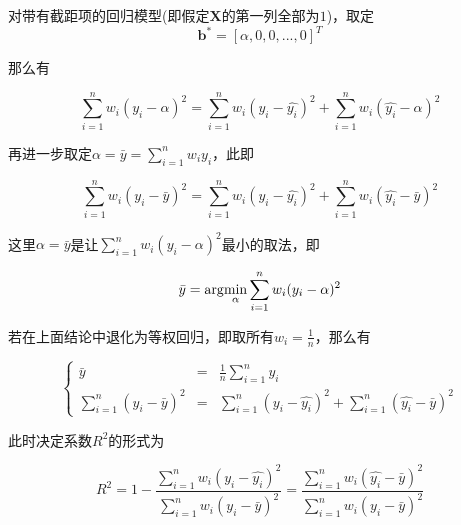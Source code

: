 \begin{mingti}
    对带有截距项的回归模型(即假定$\bm{X}$的第一列全部为$1$)，取定
    \begin{equation}
        \bm{b^*} = [\alpha,0,0,...,0]^T
    \end{equation}

    那么有

    \begin{equation}
        \sum_{i=1}^nw_i(y_i - \alpha)^2 = \sum_{i=1}^nw_i(y_i - \hat{y_i})^2 + \sum_{i=1}^nw_i(\hat{y_i} - \alpha)^2
    \end{equation}

    再进一步取定$\alpha = \bar{y} = \sum_{i=1}^nw_iy_i$，此即

    \begin{equation}
        \sum_{i=1}^nw_i(y_i - \bar{y})^2 = \sum_{i=1}^nw_i(y_i - \hat{y_i})^2 + \sum_{i=1}^nw_i(\hat{y_i} - \bar{y})^2
    \end{equation}

    这里$\alpha = \bar{y}$是让$\sum_{i=1}^nw_i(y_i - \alpha)^2$最小的取法，即

    \begin{equation}
        \bar{y} = \arg\!\min_{\alpha}\sum_{i=1}^nw_i(y_i - \alpha)^2
    \end{equation}

    若在上面结论中退化为等权回归，即取所有$w_i=\frac{1}{n}$，那么有

    \begin{equation}
        \left\{
        \begin{array}{rcl}
            \bar{y}                       & = & \frac{1}{n}\sum_{i=1}^ny_i                                            \\
            \sum_{i=1}^n(y_i - \bar{y})^2 & = & \sum_{i=1}^n(y_i - \hat{y_i})^2 + \sum_{i=1}^n(\hat{y_i} - \bar{y})^2
        \end{array}
        \right.
    \end{equation}

    此时决定系数$R^2$的形式为

    \begin{equation}
        R^2 = 1 - \frac{\sum_{i=1}^nw_i(y_i - \hat{y_i})^2}{\sum_{i=1}^nw_i(y_i - \bar{y})^2} = \frac{\sum_{i=1}^nw_i(\hat{y_i} - \bar{y})^2}{\sum_{i=1}^nw_i(y_i - \bar{y})^2}
    \end{equation}
\end{mingti}

